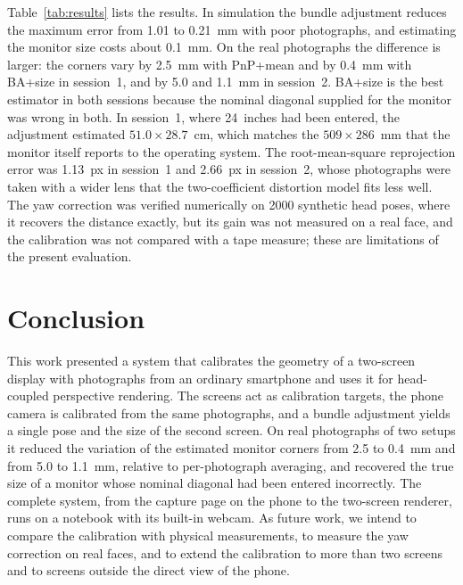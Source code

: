 \documentclass[english,hidelinks]{sbrt}
\begin{document}
Table~\ref{tab:results} lists the results. In simulation the bundle adjustment reduces the maximum error from 1.01 to 0.21~mm with poor photographs, and estimating the monitor size costs about 0.1~mm. On the real photographs the difference is larger: the corners vary by 2.5~mm with PnP+mean and by 0.4~mm with BA+size in session~1, and by 5.0 and 1.1~mm in session~2. BA+size is the best estimator in both sessions because the nominal diagonal supplied for the monitor was wrong in both. In session~1, where 24~inches had been entered, the adjustment estimated $51.0\times28.7$~cm, which matches the $509\times286$~mm that the monitor itself reports to the operating system. The root-mean-square reprojection error was 1.13~px in session~1 and 2.66~px in session~2, whose photographs were taken with a wider lens that the two-coefficient distortion model fits less well. The yaw correction was verified numerically on 2000 synthetic head poses, where it recovers the distance exactly, but its gain was not measured on a real face, and the calibration was not compared with a tape measure; these are limitations of the present evaluation.

\section{Conclusion}
\label{sec:V}

This work presented a system that calibrates the geometry of a two-screen display with photographs from an ordinary smartphone and uses it for head-coupled perspective rendering. The screens act as calibration targets, the phone camera is calibrated from the same photographs, and a bundle adjustment yields a single pose and the size of the second screen. On real photographs of two setups it reduced the variation of the estimated monitor corners from 2.5 to 0.4~mm and from 5.0 to 1.1~mm, relative to per-photograph averaging, and recovered the true size of a monitor whose nominal diagonal had been entered incorrectly. The complete system, from the capture page on the phone to the two-screen renderer, runs on a notebook with its built-in webcam. As future work, we intend to compare the calibration with physical measurements, to measure the yaw correction on real faces, and to extend the calibration to more than two screens and to screens outside the direct view of the phone.



\end{document}
